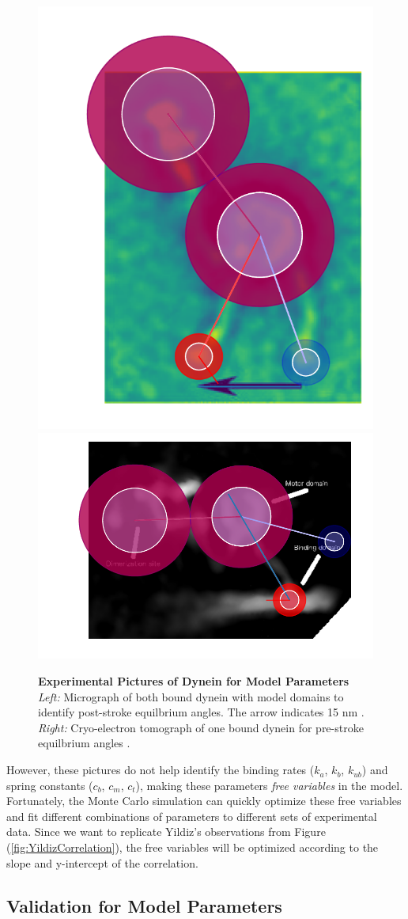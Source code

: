 \begin{figure}[hbt!]
	\centering
	\includegraphics[width=0.3\columnwidth]{../../plots/burgess-model-figure.pdf}
	\includegraphics[width=0.5\columnwidth]{../../plots/grotjahn-model-figure.pdf}%
	\caption[Experimental Pictures of Dynein for Model Parameters]{\textbf{Experimental Pictures of Dynein for Model Parameters} \textit{Left:} Micrograph of both bound dynein with model domains to identify post-stroke equilbrium angles. The arrow indicates 15 nm \cite{Burgess2003}.  \textit{Right:} Cryo-electron tomograph of one bound dynein for pre-stroke equilbrium angles \cite{grotjahn2018cryo}.} 
	\label{fig:ParamsPics}
\end{figure}

However, these pictures do not help identify the binding rates ($k_a$, $k_b$, $k_{ub}$) and spring constants ($c_b$, $c_m$, $c_t$), making these parameters \textit{free variables} in the model. Fortunately, the Monte Carlo simulation can quickly optimize these free variables and fit different combinations of parameters to  different sets of experimental data. Since we want to replicate Yildiz's observations from Figure (\ref{fig:YildizCorrelation}), the free variables will be optimized according to the slope and y-intercept of the correlation. 

\subsection{Validation for Model Parameters}

